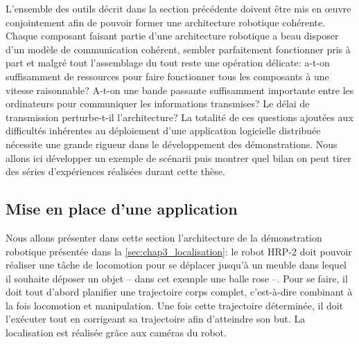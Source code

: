 L'ensemble des outils décrit dans la section précédente doivent être
mis en \oe uvre conjointement afin de pouvoir former une architecture
robotique cohérente. Chaque composant faisant partie d'une
architecture robotique a beau disposer d'un modèle de communication
cohérent, sembler parfaitement fonctionner pris à part et malgré tout
l'assemblage du tout reste une opération délicate: a-t-on suffisamment
de ressources pour faire fonctionner tous les composants à une vitesse
raisonnable? A-t-on une bande passante suffisamment importante entre
les ordinateurs pour communiquer les informations transmises? Le délai
de transmission perturbe-t-il l'architecture? La totalité de ces
questions ajoutées aux difficultés inhérentes au déploiement d'une
application logicielle distribuée nécessite une grande rigueur dans le
développement des démonstrations. Nous allons ici développer un
exemple de scénarii puis montrer quel bilan on peut tirer des séries
d'expériences réalisées durant cette thèse.


\subsection{Mise en place d'une application}


Nous allons présenter dans cette section l'architecture de la
démonstration robotique présentée dans la
\autoref{sec:chap3_localisation}: le robot HRP-2 doit pouvoir réaliser
une tâche de locomotion pour se déplacer jusqu'à un meuble dans lequel
il souhaite déposer un objet -- dans cet exemple une balle rose
--. Pour se faire, il doit tout d'abord planifier une trajectoire
corps complet, c'est-à-dire combinant à la fois locomotion et
manipulation. Une fois cette trajectoire déterminée, il doit
l'exécuter tout en corrigeant sa trajectoire afin d'atteindre son
but. La localisation est réalisée grâce aux caméras du robot.

